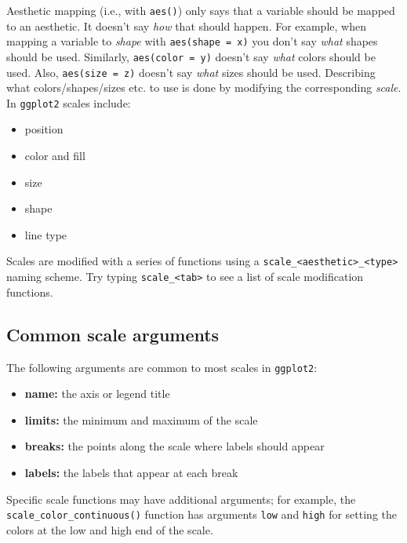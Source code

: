 \documentclass[
]{book}
\providecommand{\tightlist}{%
  \setlength{\itemsep}{0pt}\setlength{\parskip}{0pt}}
\begin{document}
Aesthetic mapping (i.e., with \texttt{aes()}) only says that a variable should be mapped to an aesthetic. It doesn't say \emph{how} that should happen. For example, when mapping a variable to \emph{shape} with \texttt{aes(shape\ =\ x)} you don't say \emph{what} shapes should be used. Similarly, \texttt{aes(color\ =\ y)} doesn't say \emph{what} colors should be used. Also, \texttt{aes(size\ =\ z)} doesn't say \emph{what} sizes should be used. Describing what colors/shapes/sizes etc. to use is done by modifying the corresponding \emph{scale}. In \texttt{ggplot2} scales include:

\begin{itemize}
\tightlist
\item
  position
\item
  color and fill
\item
  size
\item
  shape
\item
  line type
\end{itemize}

Scales are modified with a series of functions using a \texttt{scale\_\textless{}aesthetic\textgreater{}\_\textless{}type\textgreater{}} naming scheme. Try typing \texttt{scale\_\textless{}tab\textgreater{}} to see a list of scale modification functions.

\hypertarget{common-scale-arguments}{%
\subsection{Common scale arguments}\label{common-scale-arguments}}

The following arguments are common to most scales in \texttt{ggplot2}:

\begin{itemize}
\tightlist
\item
  \textbf{name:} the axis or legend title
\item
  \textbf{limits:} the minimum and maximum of the scale
\item
  \textbf{breaks:} the points along the scale where labels should appear
\item
  \textbf{labels:} the labels that appear at each break
\end{itemize}

Specific scale functions may have additional arguments; for example, the \texttt{scale\_color\_continuous()} function has arguments \texttt{low} and \texttt{high} for setting the colors at the low and high end of the scale.
\end{document}
